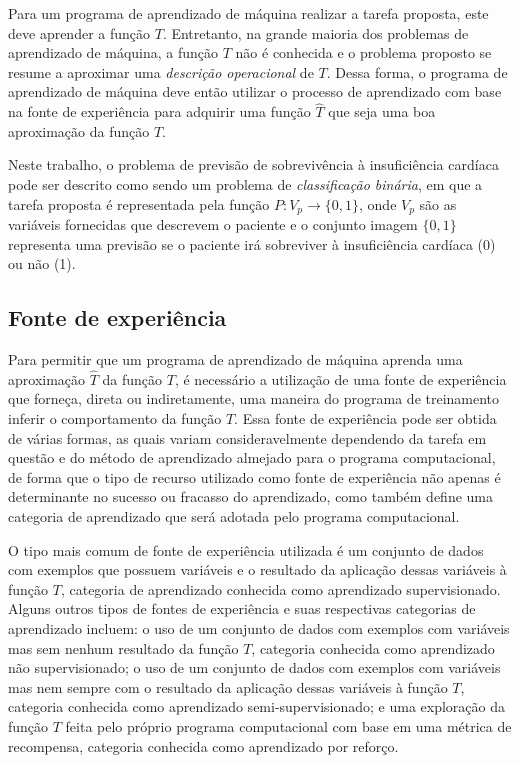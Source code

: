 Para um programa de aprendizado de máquina realizar a tarefa proposta, este deve aprender a função $T$. Entretanto, na grande maioria dos problemas de aprendizado de máquina, a função $T$ não é conhecida e o problema proposto se resume a aproximar uma \textit{descrição operacional} de $T$\cite[p.8]{machine_learning}. Dessa forma, o programa de aprendizado de máquina deve então utilizar o processo de aprendizado com base na fonte de experiência para adquirir uma função $\hat{T}$ que seja uma boa aproximação da função $T$.

Neste trabalho, o problema de previsão de sobrevivência à insuficiência cardíaca pode ser descrito como sendo um problema de \textit{classificação binária}, em que a tarefa proposta é representada pela função $P : V_{p} \rightarrow \{0, 1\}$, onde $V_{p}$ são as variáveis fornecidas que descrevem o paciente e o conjunto imagem $\{0, 1\}$ representa uma previsão se o paciente irá sobreviver à insuficiência cardíaca (0) ou não (1).

\subsection{Fonte de experiência}

Para permitir que um programa de aprendizado de máquina aprenda uma aproximação $\hat{T}$ da função $T$, é necessário a utilização de uma fonte de experiência que forneça, direta ou indiretamente, uma maneira do programa de treinamento inferir o comportamento da função $T$. Essa fonte de experiência pode ser obtida de várias formas, as quais variam consideravelmente dependendo da tarefa em questão e do método de aprendizado almejado para o programa computacional, de forma que o tipo de recurso utilizado como fonte de experiência não apenas é determinante no sucesso ou fracasso do aprendizado, como também define uma categoria de aprendizado que será adotada pelo programa computacional.

O tipo mais comum de fonte de experiência utilizada é um conjunto de dados com exemplos que possuem variáveis e o resultado da aplicação dessas variáveis à função $T$, categoria de aprendizado conhecida como aprendizado supervisionado. Alguns outros tipos de fontes de experiência e suas respectivas categorias de aprendizado incluem: o uso de um conjunto de dados com exemplos com variáveis mas sem nenhum resultado da função $T$, categoria conhecida como aprendizado não supervisionado; o uso de um conjunto de dados com exemplos com variáveis mas nem sempre com o resultado da aplicação dessas variáveis à função $T$, categoria conhecida como aprendizado semi-supervisionado; e uma exploração da função $T$ feita pelo próprio programa computacional com base em uma métrica de recompensa, categoria conhecida como aprendizado por reforço.

